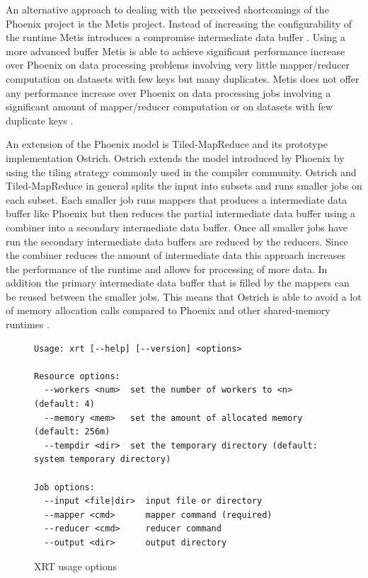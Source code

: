\documentclass[twocolumn,11px]{article}       %
\begin{document}
An alternative approach to dealing with the perceived shortcomings of the
Phoenix project is the Metis project. Instead of increasing the configurability
of the runtime Metis introduces a compromise intermediate data buffer
\cite{Metis}. Using a more advanced buffer Metis is able to achieve significant
performance increase over Phoenix on data processing problems involving very
little mapper/reducer computation on datasets with few keys but many duplicates.
Metis does not offer any performance increase over Phoenix on data processing
jobs involving a significant amount of mapper/reducer computation or on datasets
with few duplicate keys \cite{Metis}.

An extension of the Phoenix model is Tiled-MapReduce and its prototype
implementation Ostrich. Ostrich extends the model introduced by Phoenix by using
the tiling strategy commonly used in the compiler community. Ostrich and
Tiled-MapReduce in general splits the input into subsets and runs smaller jobs on each
subset. Each smaller job runs mappers that produces a intermediate data buffer
like Phoenix but then reduces the partial intermediate data buffer using a
combiner into a secondary intermediate data buffer. Once all smaller jobs have
run the secondary intermediate data buffers are reduced by the reducers. Since
the combiner reduces the amount of intermediate data this approach increases the
performance of the runtime and allows for processing of more data. In addition
the primary intermediate data buffer that is filled by the mappers can be reused
between the smaller jobs. This means that Ostrich is able to avoid a lot of
memory allocation calls compared to Phoenix and other shared-memory runtimes
\cite{Ostrich}.

\begin{figure}[h]
\begin{lstlisting}
Usage: xrt [--help] [--version] <options>

Resource options:
  --workers <num>  set the number of workers to <n> (default: 4)
  --memory <mem>   set the amount of allocated memory (default: 256m)
  --tempdir <dir>  set the temporary directory (default: system temporary directory)

Job options:
  --input <file|dir>  input file or directory
  --mapper <cmd>      mapper command (required)
  --reducer <cmd>     reducer command
  --output <dir>      output directory
\end{lstlisting}
\caption{XRT usage options}
\label{fig:xrt}
\end{figure}
\end{document}
